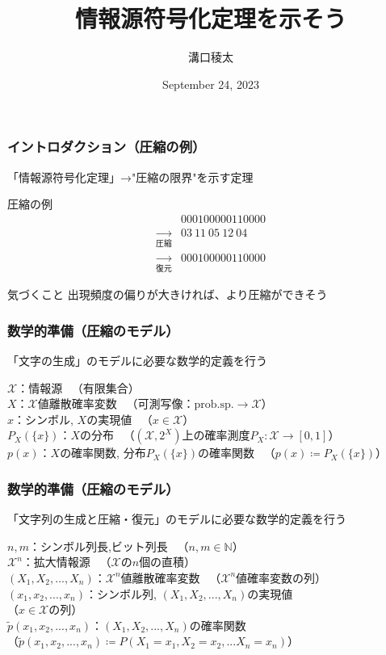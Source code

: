 \documentclass{classes/myslide}
\title{情報源符号化定理を示そう}
\author{溝口稜太}
\institute{創域理工学部情報計算科学科４年}
\date{September 24, 2023}
\begin{document}
\begin{frame}
  \titlepage
\end{frame}

\begin{frame}\frametitle{イントロダクション（圧縮の例）}

  「情報源符号化定理」→"圧縮の限界"を示す定理

  \begin{exampleblock}{圧縮の例}
    \begin{align*}
      &000100000110000 \\
      \xrightarrow[圧縮]{} & 03 \ 11 \ 05 \ 12 \ 04 \\
      \xrightarrow[復元]{} & 000100000110000 
    \end{align*}
  \end{exampleblock}

  \begin{alertblock}{気づくこと}
    出現頻度の偏りが大きければ、より圧縮ができそう
  \end{alertblock}

\end{frame}

\begin{frame}\frametitle{数学的準備（圧縮のモデル）}
  「文字の生成」のモデルに必要な数学的定義を行う
  \begin{definition}[情報源など]
    $\mathcal{X}$：情報源 \ （有限集合）\\
    $X$：$\mathcal{X}$値離散確率変数 \ （可測写像：$\mathrm{prob. sp.} \rightarrow \mathcal{X}$）\\
    $x$：シンボル, $X$の実現値 \ （$ x \in \mathcal{X}$） \\
    $P_X(\{x\})$：$X$の分布 \ （$(\mathcal{X}, 2^{X})$上の確率測度$P_X: \mathcal{X} \rightarrow [0, 1]$） \\
    $p(x)$：$X$の確率関数, 分布$P_X(\{x\})$の確率関数 \ （$p(x) \coloneq P_X(\{x\})$）
  \end{definition}
\end{frame}

\begin{frame}\frametitle{数学的準備（圧縮のモデル）}
  「文字列の生成と圧縮・復元」のモデルに必要な数学的定義を行う
  \begin{definition}[拡大情報源など]
    $n, m$：シンボル列長,ビット列長 \ （$n, m \in \mathbb{N}$）\\
    $\mathcal{X}^n$：拡大情報源 \ （$\mathcal{X}$の$n$個の直積）\\
    $(X_1, X_2, ..., X_n)$：$\mathcal{X}^n$値離散確率変数 \ （$\mathcal{X}^n$値確率変数の列）\\
    $(x_1, x_2, ..., x_n )$：シンボル列, $(X_1, X_2, ..., X_n)$の実現値  \\ \quad （$ x \in \mathcal{X}$の列）\\
    $\tilde{p}(x_1, x_2, ..., x_n )$：$(X_1, X_2, ..., X_n)$の確率関数 \\ \quad（$\tilde{p}(x_1, x_2, ..., x_n ) \coloneq P(X_1 = x_1, X_2 = x_2,... X_n = x_n)$）
  \end{definition}
\end{frame}
\end{document}
